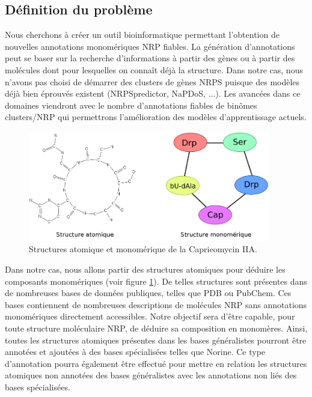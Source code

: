 \label{problems}

\subsection{Définition du problème}

Nous cherchons à créer un outil bioinformatique permettant l'obtention de nouvelles annotations monomériques NRP fiables.
La génération d'annotations peut se baser sur la recherche d'informations à partir des gènes ou à partir des molécules dont pour lesquelles on connaît déjà la structure.
Dans notre cas, nous n'avons pas choisi de démarrer des clusters de gènes NRPS puisque des modèles déjà bien éprouvés existent (NRPSpredictor, NaPDoS, ...).
Les avancées dans ce domaines viendront avec le nombre d'annotations fiables de binômes clusters/NRP qui permettrons l'amélioration des modèles d'apprentissage actuels.

\begin{figure}[!ht]
  \begin{center}
    \includegraphics[width=400px]{Figures/s2m/Intro/structures.png}
    \caption{\label{structures}Structures atomique et monomérique de la Caprieomycin IIA.}
  \end{center}
\end{figure}

Dans notre cas, nous allons partir des structures atomiques pour déduire les composants monomériques (voir figure \ref{structures}).
De telles structures sont présentes dans de nombreuses bases de données publiques, telles que PDB ou PubChem.
Ces bases contiennent de nombreuses descriptions de molécules NRP sans annotations monomériques directement accessibles.
Notre objectif sera d'être capable, pour toute structure moléculaire NRP, de déduire sa composition en monomères.
Ainsi, toutes les structures atomiques présentes dans les bases généralistes pourront être annotées et ajoutées à des bases spécialisées telles que Norine.
Ce type d'annotation pourra également être effectué pour mettre en relation les structures atomiques non annotées des bases généralistes avec les annotations non liés des bases spécialisées.



